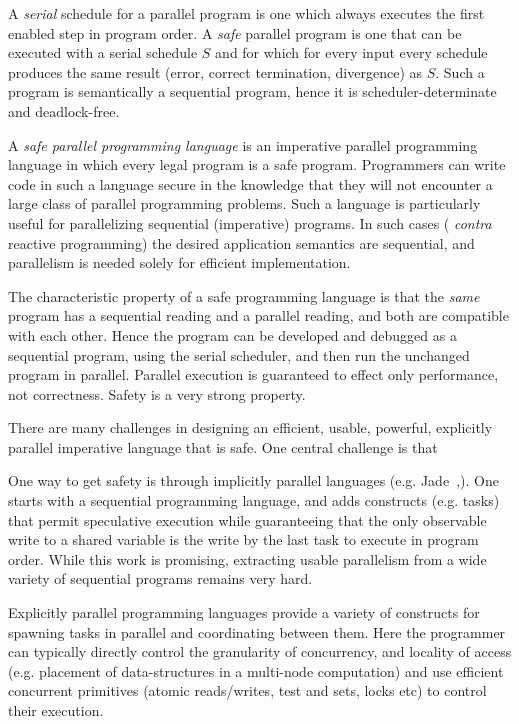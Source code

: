 A {\em serial} schedule for a parallel program is one which always
executes the first enabled step in program order. A {\em safe}
parallel program is one that can be executed with a serial schedule
$S$ and for which for every input every schedule produces the same
result (error, correct termination, divergence) as $S$.  Such a
program is semantically a sequential program, hence it is
scheduler-determinate and deadlock-free.

A {\em safe parallel programming language} is an imperative parallel
programming language in which every legal program is a safe
program. Programmers can write code in such a language secure in the
knowledge that they will not encounter a large class of parallel
programming problems. Such a language is particularly useful for
parallelizing sequential (imperative) programs. In such cases ({\em
  contra} reactive programming) the desired application semantics are
sequential, and parallelism is needed solely for efficient
implementation.

The characteristic property of a safe programming language is that the
{\em same} program has a sequential reading and a parallel reading,
and both are compatible with each other. Hence the program can be
developed and debugged as a sequential program, using the serial
scheduler, and then run the unchanged program in parallel.  Parallel
execution is guaranteed to effect only performance, not
correctness. Safety is a very strong property.

There are many challenges in designing an efficient, usable, powerful,
explicitly parallel imperative language that is safe. One central
challenge is that 

One way to get safety is through implicitly parallel languages (e.g.{}
Jade~\cite{Rinard98thedesign},\cite{vonPraun:2007:IPO:1229428.1229443}). One
starts with a sequential programming language, and adds constructs
(e.g.{} tasks) that permit speculative execution while guaranteeing
that the only observable write to a shared variable is the write by
the last task to execute in program order.  While this work is
promising, extracting usable parallelism from a wide variety of
sequential programs remains very hard.

Explicitly parallel programming languages provide a variety of
constructs for spawning tasks in parallel and coordinating between
them. Here the programmer can typically directly control the
granularity of concurrency, and locality of access (e.g. placement of
data-structures in a multi-node computation) and use efficient
concurrent primitives (atomic reads/writes, test and sets, locks etc)
to control their execution. 


